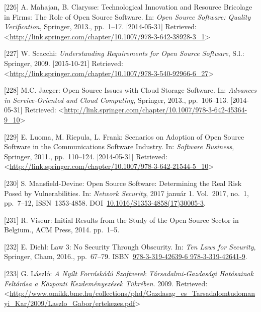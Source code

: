 \documentclass[12pt,magyar,a4paper,oneside]{scrreprt}
\begin{document}
\leavevmode\hypertarget{ref-mahajan_technological_2013}{}%
{[}226{]} A. Mahajan, B. Clarysse: Technological Innovation and Resource
Bricolage in Firms: The Role of Open Source Software. In: \emph{Open
Source Software: Quality Verification}, Springer, 2013., pp.~1--17.
{[}2014-05-31{]} Retrieved:
\textless{}\url{http://link.springer.com/chapter/10.1007/978-3-642-38928-3_1}\textgreater{}

\leavevmode\hypertarget{ref-scacchi_understanding_2009}{}%
{[}227{]} W. Scacchi: \emph{Understanding Requirements for Open Source
Software}, S.l.: Springer, 2009. {[}2015-10-21{]} Retrieved:
\textless{}\url{http://link.springer.com/chapter/10.1007/978-3-540-92966-6_27}\textgreater{}

\leavevmode\hypertarget{ref-jaeger_open_2013}{}%
{[}228{]} M.C. Jaeger: Open Source Issues with Cloud Storage Software.
In: \emph{Advances in Service-Oriented and Cloud Computing}, Springer,
2013., pp.~106--113. {[}2014-05-31{]} Retrieved:
\textless{}\url{http://link.springer.com/chapter/10.1007/978-3-642-45364-9_10}\textgreater{}

\leavevmode\hypertarget{ref-luoma_scenarios_2011}{}%
{[}229{]} E. Luoma, M. Riepula, L. Frank: Scenarios on Adoption of Open
Source Software in the Communications Software Industry. In:
\emph{Software Business}, Springer, 2011., pp.~110--124.
{[}2014-05-31{]} Retrieved:
\textless{}\url{http://link.springer.com/chapter/10.1007/978-3-642-21544-5_10}\textgreater{}

\leavevmode\hypertarget{ref-mansfield-devine_open_2017}{}%
{[}230{]} S. Mansfield-Devine: Open Source Software: Determining the
Real Risk Posed by Vulnerabilities. In: \emph{Network Security}, 2017
január 1. Vol.~2017, no.~1, pp.~7--12, ISSN~1353-4858.
DOI~\href{https://doi.org/10.1016/S1353-4858(17)30005-3}{10.1016/S1353-4858(17)30005-3}.

\leavevmode\hypertarget{ref-viseur_initial_2014}{}%
{[}231{]} R. Viseur: Initial Results from the Study of the Open Source
Sector in Belgium., ACM Press, 2014. pp.~1--5.

\leavevmode\hypertarget{ref-diehl_law_2016}{}%
{[}232{]} E. Diehl: Law 3: No Security Through Obscurity. In: \emph{Ten
Laws for Security}, Springer, Cham, 2016., pp.~67--79.
ISBN~\href{https://worldcat.org/isbn/978-3-319-42639-6\%20978-3-319-42641-9}{978-3-319-42639-6 978-3-319-42641-9}.

\leavevmode\hypertarget{ref-laszlo_nyilt_2009}{}%
{[}233{]} G. László: \emph{A Nyílt Forráskódú Szoftverek
Társadalmi-Gazdasági Hatásainak Feltárása a Központi Kezdeményezések
Tükrében}. 2009. Retrieved:
\textless{}\url{http://www.omikk.bme.hu/collections/phd/Gazdasag_es_Tarsadalomtudomanyi_Kar/2009/Laszlo_Gabor/ertekezes.pdf}\textgreater{}
\end{document}
